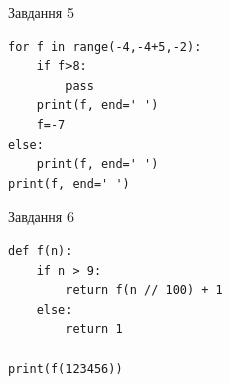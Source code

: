 \documentclass[12pt, ukrainian]{article}
\begin{document}
{\vspace{15mm}
\begin{minipage}[t]{9.7cm}                
{\begin{center}Завдання {5}\end{center}}
\begin{verbatim}
for f in range(-4,-4+5,-2):
    if f>8:
        pass
    print(f, end=' ')
    f=-7
else:
    print(f, end=' ')
print(f, end=' ')
\end{verbatim}     
\end{minipage}
\vline \hspace{8mm}
\begin{minipage}[t]{8.0cm}                
{\begin{center}Завдання {6}\end{center}}
\begin{verbatim}
def f(n):
    if n > 9:
        return f(n // 100) + 1
    else:
        return 1

print(f(123456))
\end{verbatim}     
\end{minipage}

}
\newpage
\end{document}
